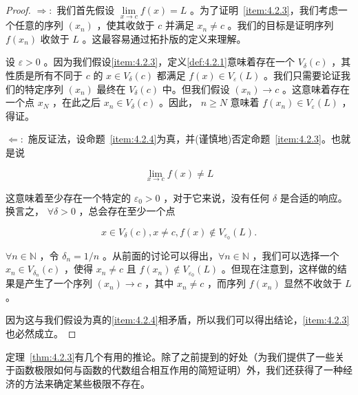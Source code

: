\begin{proof}
\( \Rightarrow :\) 我们首先假设 \(\mathop{\lim }\limits_{{x \rightarrow  c}}f\left( x\right)  = L\) 。为了证明~\ref{item:4.2.3}，我们考虑一个任意的序列 \(\left( {x}_{n}\right)\) ，使其收敛于 \(c\) 并满足 \({x}_{n} \neq  c\) 。我们的目标是证明序列 \(f\left( {x}_{n}\right)\) 收敛于 \(L\) 。这最容易通过拓扑版的定义来理解。

设 \(\varepsilon  > 0\) 。因为我们假设\ref{item:4.2.3}，定义\ref{def:4.2.1}意味着存在一个 \({V}_{\delta }\left( c\right)\) ，其性质是所有不同于 \(c\) 的 \(x \in  {V}_{\delta }\left( c\right)\) 都满足 \(f\left( x\right)  \in  {V}_{\varepsilon }\left( L\right)\) 。我们只需要论证我们的特定序列 \(\left( {x}_{n}\right)\) 最终在 \({V}_{\delta }\left( c\right)\) 中。但我们假设 \(\left( {x}_{n}\right)  \rightarrow  c\) 。这意味着存在一个点 \({x}_{N}\) ，在此之后 \({x}_{n} \in  {V}_{\delta }\left( c\right)\) 。因此， \(n \geq  N\) 意味着 \(f\left( {x}_{n}\right)  \in  {V}_{\varepsilon }\left( L\right)\) ，得证。

$\Leftarrow:$ 施反证法，设命题~\ref{item:4.2.4}为真，并(谨慎地)否定命题~\ref{item:4.2.3}。也就是说

\[
\mathop{\lim }\limits_{{x \rightarrow  c}}f\left( x\right)  \neq  L
\]

这意味着至少存在一个特定的 \({\varepsilon }_{0} > 0\) ，对于它来说，没有任何 \(\delta\) 是合适的响应。换言之， \(\forall \delta  > 0\) ，总会存在至少一个点

\[
x \in  {V}_{\delta }\left( c\right), x \neq  c, f\left( x\right)  \notin  {V}_{{\varepsilon }_{0}}\left( L\right) .
\]

\(\forall n \in  \mathbb{N}\) ，令 \({\delta }_{n} = 1/n\) 。从前面的讨论可以得出，\(\forall n \in  \mathbb{N}\) ，我们可以选择一个 \({x}_{n} \in  {V}_{{\delta }_{n}}\left( c\right)\) ，使得 \({x}_{n} \neq  c\) 且 \(f\left( {x}_{n}\right)  \notin  {V}_{{\varepsilon }_{0}}\left( L\right)\) 。但现在注意到，这样做的结果是产生了一个序列 \(\left( {x}_{n}\right)  \rightarrow  c\) ，其中 \({x}_{n} \neq  c\) ，而序列 \(f\left( {x}_{n}\right)\) 显然不收敛于 \(L\) 。

因为这与我们假设为真的\ref{item:4.2.4}相矛盾，所以我们可以得出结论，\ref{item:4.2.3}也必然成立。  
\end{proof}

定理~\ref{thm:4.2.3}有几个有用的推论。除了之前提到的好处（为我们提供了一些关于函数极限如何与函数的代数组合相互作用的简短证明）外，我们还获得了一种经济的方法来确定某些极限不存在。


